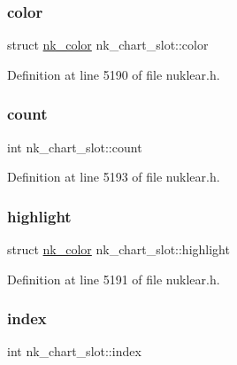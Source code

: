 \subsubsection{\texorpdfstring{color}{color}}
{\footnotesize\ttfamily struct \mbox{\hyperlink{structnk__color}{nk\+\_\+color}} nk\+\_\+chart\+\_\+slot\+::color}



Definition at line 5190 of file nuklear.\+h.

\mbox{\label{structnk__chart__slot_a0b700427a0a5f1431331629763476afb}} 
\subsubsection{\texorpdfstring{count}{count}}
{\footnotesize\ttfamily int nk\+\_\+chart\+\_\+slot\+::count}



Definition at line 5193 of file nuklear.\+h.

\mbox{\label{structnk__chart__slot_a0336ff329d36a3422aeec4c3009f02ce}} 
\subsubsection{\texorpdfstring{highlight}{highlight}}
{\footnotesize\ttfamily struct \mbox{\hyperlink{structnk__color}{nk\+\_\+color}} nk\+\_\+chart\+\_\+slot\+::highlight}



Definition at line 5191 of file nuklear.\+h.

\mbox{\label{structnk__chart__slot_ae66e71dddf3f3811ebfd06a21c49157e}} 
\subsubsection{\texorpdfstring{index}{index}}
{\footnotesize\ttfamily int nk\+\_\+chart\+\_\+slot\+::index}



